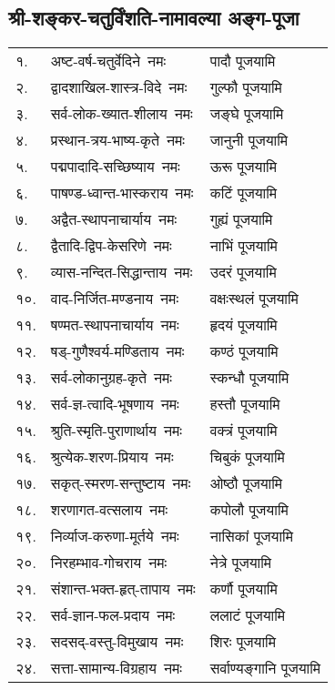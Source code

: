 \begin{center}
\section{श्री-शङ्कर-चतुर्विंशति-नामावल्या अङ्ग-पूजा}
\begin{tabular}{lll}
१. & अष्ट-वर्ष-चतुर्वेदिने~नमः &  पादौ पूजयामि\\
२. & द्वादशाखिल-शास्त्र-विदे~नमः &  गुल्फौ पूजयामि\\
३. & सर्व-लोक-ख्यात-शीलाय~नमः &  जङ्घे पूजयामि\\
४. & प्रस्थान-त्रय-भाष्य-कृते~नमः &  जानुनी पूजयामि\\
५. & पद्मपादादि-सच्छिष्याय~नमः &  ऊरू पूजयामि\\
६. & पाषण्ड-ध्वान्त-भास्कराय~नमः &  कटिं पूजयामि\\
७. & अद्वैत-स्थापनाचार्याय~नमः &  गुह्यं पूजयामि\\
८. & द्वैतादि-द्विप-केसरिणे~नमः &  नाभिं पूजयामि\\
९. & व्यास-नन्दित-सिद्धान्ताय~नमः &  उदरं पूजयामि\\
१०. & वाद-निर्जित-मण्डनाय~नमः &  वक्षःस्थलं पूजयामि\\
११. & षण्मत-स्थापनाचार्याय~नमः &  हृदयं पूजयामि\\
१२. & षड्-गुणैश्वर्य-मण्डिताय~नमः &  कण्ठं पूजयामि\\
१३. & सर्व-लोकानुग्रह-कृते~नमः &  स्कन्धौ पूजयामि\\
१४. & सर्व-ज्ञ-त्वादि-भूषणाय~नमः &  हस्तौ पूजयामि\\
१५. & श्रुति-स्मृति-पुराणार्थाय~नमः &  वक्त्रं पूजयामि\\
१६. & श्रुत्येक-शरण-प्रियाय~नमः &  चिबुकं पूजयामि\\
१७. & सकृत्-स्मरण-सन्तुष्टाय~नमः &  ओष्ठौ पूजयामि\\
१८. & शरणागत-वत्सलाय~नमः &  कपोलौ पूजयामि\\
१९. & निर्व्याज-करुणा-मूर्तये~नमः &  नासिकां पूजयामि\\
२०. & निरहम्भाव-गोचराय~नमः &  नेत्रे पूजयामि\\
२१. & संशान्त-भक्त-हृत्-तापाय~नमः &  कर्णौ पूजयामि\\
२२. & सर्व-ज्ञान-फल-प्रदाय~नमः &  ललाटं पूजयामि\\
२३. & सदसद्-वस्तु-विमुखाय~नमः &  शिरः पूजयामि\\
२४. & सत्ता-सामान्य-विग्रहाय~नमः& सर्वाण्यङ्गानि पूजयामि\\
\end{tabular}


\begingroup
\centering
\setlength{\columnseprule}{1pt}
\let\chapt\sect

\endgroup





\end{center}

